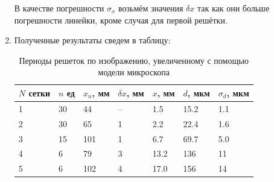 \documentclass[a4paper,12pt]{article}
\begin{document}
\begin{enumerate}
\noindent В качестве погрешности $\sigma_x$ возьмём значения $\delta x$ так как они больше погрешности линейки, кроме случая для первой решётки.
\item Полученные результаты сведем в таблицу:
\begin{table}[]
\centering
\begin{tabular}{|l|l|l|l|l|l|l|}
\hline
$N$ сетки & $n$ ед & $x_n$, мм & $\delta x$,  мм & $x$, мм & $d$, мкм & $\sigma_d$, мкм \\ \hline
1   & 30  & 44        & --              & 1.5     & 15.2     & 1.1             \\ \hline
2   & 30  & 65        & 1              & 2.2     & 22.4     & 1.6             \\ \hline
3   & 15  & 101       & 1              & 6.7     & 69.7     & 5.0             \\ \hline
4   & 6   & 79        & 3              & 13.2    & 136      & 11              \\ \hline
5   & 6   & 102       & 4              & 17.0    & 156      & 14              \\ \hline
\end{tabular}
\caption{Периоды решеток по изображению, увеличенному с помощью модели микроскопа}
\label{tab:2met}
\end{table}
\end{enumerate}
\end{document}
